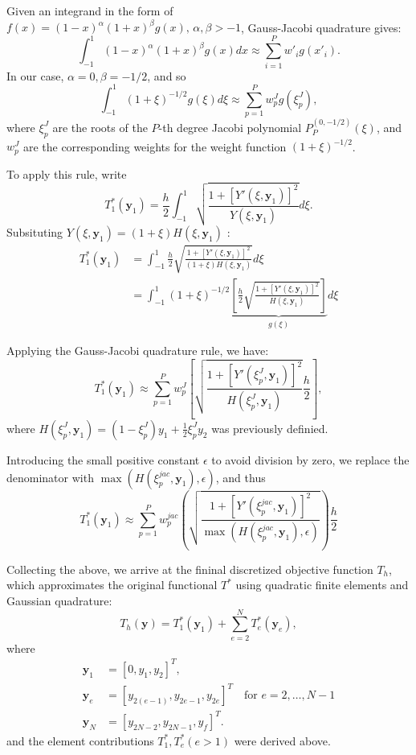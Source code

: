 \documentclass[12pt]{article}
\begin{document}
Given an integrand in the form of \( f(x) = (1-x)^{\alpha} (1+x)^{\beta}  g(x), \, \alpha, \beta > -1  \), Gauss-Jacobi quadrature gives:  
\[ 
    \int_{-1}^{1} (1-x)^{\alpha} (1+x)^{\beta} g(x) dx \approx \sum_{i=1}^{P} w'_{i} g(x'_{i}).
\]
In our case,  \(\alpha=0, \beta=-1/2\), and so 
\[ 
    \int_{-1}^{1} (1+\xi)^{-1/2} g(\xi) d\xi \approx \sum_{p=1}^{P} w_{p}^{J} g(\xi_{p}^{J}) ,
\]
where \( \xi_{p}^{J} \) are the roots of the \( P\)-th degree Jacobi polynomial \( P_P^{(0, -1/2)}(\xi) \), and \( w_{p}^{J} \) are the corresponding weights for the weight function \( (1+\xi)^{-1/2} \).

To apply this rule, write 
\[ 
    T_1^*(\mathbf{y}_1) = \frac{h}{2} \int_{-1}^{1} \sqrt{\frac{1 + [Y'(\xi, \mathbf{y}_1)]^2}{Y(\xi, \mathbf{y}_1)}}  d\xi.
\]
Subsituting \( Y(\xi, \mathbf{y}_1) = (1+\xi) H(\xi, \mathbf{y}_1) \) : 
\begin{align*}
    T_1^*(\mathbf{y}_1) &= \int_{-1}^{1}  \frac{h}{2} \sqrt{\frac{1 + [Y'(\xi, \mathbf{y}_1)]^2}{(1+\xi) H(\xi, \mathbf{y}_1)}} d\xi \\
    &= \int_{-1}^{1} (1+\xi)^{-1/2}  \underbrace{\left[\frac{h}{2}  \sqrt{\frac{1 + [Y'(\xi, \mathbf{y}_1)]^2}{H(\xi, \mathbf{y}_1)}} \right]}_{g(\xi)} d\xi
\end{align*}

Applying the Gauss-Jacobi quadrature rule, we have:
\[ 
    T_1^*(\mathbf{y}_1) \approx \sum_{p=1}^{P} w_{p}^{J} \left[ \sqrt{\frac{1 + [Y'(\xi_{p}^{J}, \mathbf{y}_1)]^2}{H(\xi_{p}^{J}, \mathbf{y}_1)}} \frac{h}{2} \right],
\] where \( H(\xi_{p}^{J}, \mathbf{y}_1) = (1-\xi_{p}^{J})y_1 + \frac{1}{2}\xi_{p}^{J} y_2 \) was previously definied. 

Introducing the small positive constant \( \epsilon \) to avoid division by zero, we replace the denominator with \( \max(H(\xi_{p}^{jac}, \mathbf{y}_1), \epsilon) \), and thus  
\[ 
    T_1^*(\mathbf{y}_1) \approx \sum_{p=1}^{P} w_{p}^{jac} \left( \sqrt{\frac{1 + [Y'(\xi_{p}^{jac}, \mathbf{y}_1)]^2}{ \max(H(\xi_{p}^{jac}, \mathbf{y}_1), \epsilon) }} \right) \frac{h}{2}
\]
 
Collecting the above, we arrive at the fininal discretized objective function \( T_h \), which approximates the original functional \( T^{*}  \) using quadratic finite elements and Gaussian quadrature:
\[ 
    T_h(\mathbf{y}) = T_1^*(\mathbf{y}_1) + \sum_{e=2}^{N} T_e^*(\mathbf{y}_e), 
\]
where  
\begin{align*}
    \mathbf{y}_1 &= [0, y_1, y_2]^T, \\ 
    \mathbf{y}_e &= [y_{2(e-1)}, y_{2e-1}, y_{2e}]^T \quad \text{for } e = 2, \ldots, N-1 \\ 
    \mathbf{y}_N &= [y_{2N-2}, y_{2N-1}, y_f]^T.
\end{align*}
and the element contributions \( T^{*}_1 , T^*_e ( e >1)  \) were derived above. 
\end{document}
